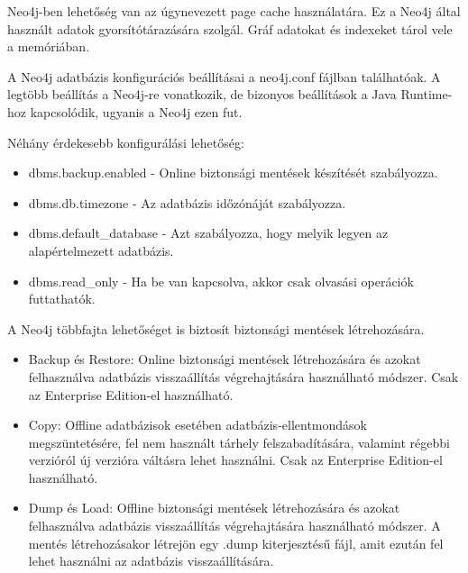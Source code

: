 \bigskip

Neo4j-ben lehetőség van az úgynevezett page cache használatára. Ez a Neo4j által használt adatok gyorsítótárazására szolgál. Gráf adatokat és indexeket tárol vele a memóriában. \cite{neo4j-page-cache}

A Neo4j adatbázis konfigurációs beállításai a neo4j.conf fájlban találhatóak. A legtöbb beállítás a Neo4j-re vonatkozik, de bizonyos beállítások a Java Runtime-hoz kapcsolódik, ugyanis a Neo4j ezen fut.

\bigskip

Néhány érdekesebb konfigurálási lehetőség: \cite{neo4j-config-settings}
\begin{itemize}
    \item dbms.backup.enabled - Online biztonsági mentések készítését szabályozza.
    \item dbms.db.timezone - Az adatbázis időzónáját szabályozza.
    \item dbms.default\_database - Azt szabályozza, hogy melyik legyen az alapértelmezett adatbázis.
    \item dbms.read\_only - Ha be van kapcsolva, akkor csak olvasási operációk futtathatók.
\end{itemize}





A Neo4j többfajta lehetőséget is biztosít biztonsági mentések létrehozására. \cite{neo4j-backup}

\begin{itemize}
    \item Backup és Restore: Online biztonsági mentések létrehozására és azokat felhasználva adatbázis visszaállítás végrehajtására használható módszer. Csak az Enterprise Edition-el használható.
    \item Copy: Offline adatbázisok esetében adatbázis-ellentmondások megszüntetésére, fel nem használt tárhely felszabadítására, valamint régebbi verzióról új verzióra váltásra lehet használni. Csak az Enterprise Edition-el használható.
    \item Dump és Load: Offline biztonsági mentések létrehozására és azokat felhasználva adatbázis visszaállítás végrehajtására használható módszer. A mentés létrehozásakor létrejön egy .dump kiterjesztésű fájl, amit ezután fel lehet használni az adatbázis visszaállítására.
\end{itemize}
